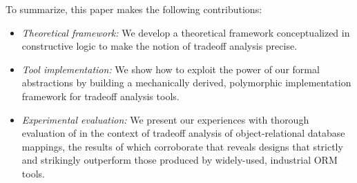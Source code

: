 \documentclass{sig-alternate}
\begin{document}





To summarize, this paper makes the following contributions:
\begin{itemize}

\item \textit{Theoretical framework:} We develop a theoretical framework conceptualized in constructive logic to make the notion of tradeoff analysis precise.

\item \textit{Tool implementation:} %
We show how to exploit the power of our formal abstractions by building a mechanically derived, polymorphic implementation framework for tradeoff analysis tools.  
 

\item \textit{Experimental evaluation:} \sloppy
We present our experiences with thorough evaluation of \@approach in the context of tradeoff analysis of object-relational database mappings, the results of which corroborate that \@approach reveals designs %
that strictly and strikingly outperform those produced by widely-used, industrial ORM tools.

\end{itemize}
\end{document}
